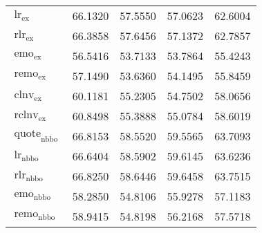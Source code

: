 \begin{table}[H]
\begin{tabular}{@{}p{5.7cm}SSSS@{}}
        $\operatorname{lr}_{\mathrm{ex}}$                                                                                     & 66.1320           & 57.5550         & 57.0623          & 62.6004 \\
        $\operatorname{rlr}_{\mathrm{ex}}$                                                                                    & 66.3858           & 57.6456         & 57.1372          & 62.7857 \\
        $\operatorname{emo}_{\mathrm{ex}}$                                                                                    & 56.5416           & 53.7133         & 53.7864          & 55.4243 \\
        $\operatorname{remo}_{\mathrm{ex}}$                                                                                   & 57.1490           & 53.6360         & 54.1495          & 55.8459 \\
        $\operatorname{clnv}_{\mathrm{ex}}$                                                                                   & 60.1181           & 55.2305         & 54.7502          & 58.0656 \\
        $\operatorname{rclnv}_{\mathrm{ex}}$                                                                                  & 60.8498           & 55.3888         & 55.0784          & 58.6019 \\ \midrule
        $\operatorname{quote}_{\mathrm{nbbo}}$                                                                                & 66.8153           & 58.5520         & 59.5565          & 63.7093 \\
        $\operatorname{lr}_{\mathrm{nbbo}}$                                                                                   & 66.6404           & 58.5902         & 59.6145          & 63.6236 \\
        $\operatorname{rlr}_{\mathrm{nbbo}}$                                                                                  & 66.8250           & 58.6446         & 59.6458          & 63.7515 \\
        $\operatorname{emo}_{\mathrm{nbbo}}$                                                                                  & 58.2850           & 54.8106         & 55.9278          & 57.1183 \\
        $\operatorname{remo}_{\mathrm{nbbo}}$                                                                                 & 58.9415           & 54.8198         & 56.2168          & 57.5718 \\

\end{tabular}
\end{table}
